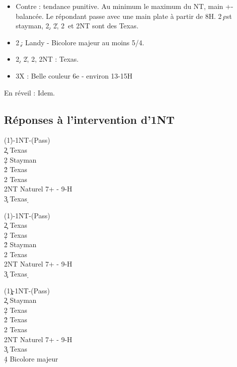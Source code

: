 \documentclass[a4paper]{article}
\begin{document}
\begin{itemize}
\item Contre : tendance punitive. Au minimum le maximum du NT, main +- balancée. Le répondant passe avec une main plate à partir de 8H.
    2\c\ est stayman, 2\d , 2\h , 2\s\ et 2NT sont des Texas.

\item 2\c\ : Landy - Bicolore majeur au moins 5/4.

\item 2\d , 2\h , 2\s , 2NT : Texas.

\item 3X : Belle couleur 6e - environ 13-15H

\end{itemize}

En réveil : Idem.

\subsection{Réponses à l'intervention d'1NT}

\begin{bidtable}
(1\h)-1NT-(Pass)\+\\
2\c \> Texas \d \\
2\d \> Stayman\\
2\h \> Texas \s \\
2\s \> Texas \c \\
2NT \> Naturel 7+ - 9-H\\
3\c \> Texas \d \-
\end{bidtable}

\begin{bidtable}
(1\s)-1NT-(Pass)\+\\
2\c \> Texas \d \\
2\d \> Texas \h \\
2\h \> Stayman\\
2\s \> Texas \c \\
2NT \> Naturel 7+ - 9-H\\
3\c \> Texas \d \-
\end{bidtable}

\begin{bidtable}
(1\c\d)-1NT-(Pass)\+\\
2\c \> Stayman\\
2\d \> Texas \h \\
2\h \> Texas \s \\
2\s \> Texas \c \\
2NT \> Naturel 7+ - 9-H\\
3\c \> Texas \d \\
4\d \> Bicolore majeur\-
\end{bidtable}
\end{document}
